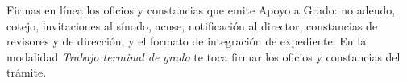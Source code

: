 \documentclass[11pt,a4paper]{article}
\begin{document}
{\small\tableofcontents}
\newpage
\begin{quevasahacer}
Firmas en línea los oficios y constancias que emite Apoyo a Grado: no adeudo, cotejo, invitaciones al sínodo, acuse, notificación al director, constancias de revisores y de dirección, y el formato de integración de expediente. En la modalidad \emph{Trabajo terminal de grado} te toca firmar los oficios y constancias del trámite.
\end{quevasahacer}




\end{document}
